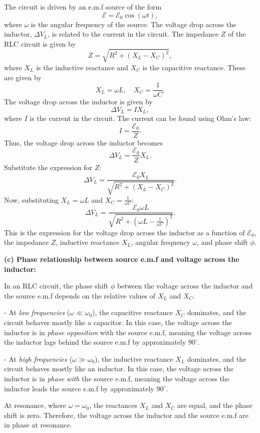 The circuit is driven by an e.m.f source of the form
\[
\mathcal{E} = \mathcal{E}_0 \cos(\omega t),
\]
where $\omega$ is the angular frequency of the source. The voltage drop across the inductor, $\Delta V_L$, is related to the current in the circuit. The impedance $Z$ of the RLC circuit is given by
\[
Z = \sqrt{R^2 + (X_L - X_C)^2},
\]
where $X_L$ is the inductive reactance and $X_C$ is the capacitive reactance. These are given by
\[
X_L = \omega L, \quad X_C = \frac{1}{\omega C}.
\]
The voltage drop across the inductor is given by
\[
\Delta V_L = I X_L,
\]
where $I$ is the current in the circuit. The current can be found using Ohm's law:
\[
I = \frac{\mathcal{E}_0}{Z}.
\]
Thus, the voltage drop across the inductor becomes
\[
\Delta V_L = \frac{\mathcal{E}_0}{Z} X_L.
\]
Substitute the expression for $Z$:
\[
\Delta V_L = \frac{\mathcal{E}_0 X_L}{\sqrt{R^2 + (X_L - X_C)^2}}.
\]
Now, substituting $X_L = \omega L$ and $X_C = \frac{1}{\omega C}$:
\[
\Delta V_L = \frac{\mathcal{E}_0 \omega L}{\sqrt{R^2 + \left(\omega L - \frac{1}{\omega C}\right)^2}}.
\]
This is the expression for the voltage drop across the inductor as a function of $\mathcal{E}_0$, the impedance $Z$, inductive reactance $X_L$, angular frequency $\omega$, and phase shift $\phi$.

\textbf{(c) Phase relationship between source e.m.f and voltage across the inductor:}

In an RLC circuit, the phase shift $\phi$ between the voltage across the inductor and the source e.m.f depends on the relative values of $X_L$ and $X_C$.

- At \textit{low frequencies} ($\omega \ll \omega_0$), the capacitive reactance $X_C$ dominates, and the circuit behaves mostly like a capacitor. In this case, the voltage across the inductor is in \textit{phase opposition} with the source e.m.f, meaning the voltage across the inductor lags behind the source e.m.f by approximately $90^\circ$.
  
- At \textit{high frequencies} ($\omega \gg \omega_0$), the inductive reactance $X_L$ dominates, and the circuit behaves mostly like an inductor. In this case, the voltage across the inductor is in \textit{phase with} the source e.m.f, meaning the voltage across the inductor leads the source e.m.f by approximately $90^\circ$.

At resonance, where $\omega = \omega_0$, the reactances $X_L$ and $X_C$ are equal, and the phase shift is zero. Therefore, the voltage across the inductor and the source e.m.f are in phase at resonance.

